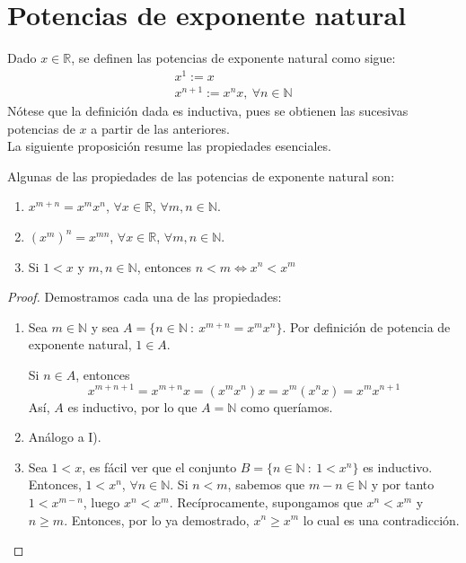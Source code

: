 
\section{Potencias de exponente natural}
Dado $x \in \mathbb{R}$, se definen las potencias de exponente natural como sigue:
\begin{gather*}
    x^1:=x\\
    x^{n+1}:=x^{n} x,~\forall n \in \mathbb{N}
\end{gather*}
Nótese que la definición dada es inductiva, pues se obtienen las sucesivas potencias de $x$ a
partir de las anteriores.\\

La siguiente proposición resume las propiedades esenciales.
\begin{prop}
    Algunas de las propiedades de las potencias de exponente natural son:
    \begin{enumerate}
        \item $x^{m+n}=x^m x^n$, $\forall x \in \mathbb{R}$, $\forall m,n \in \mathbb{N}$.

        \item $(x^m)^n=x^{mn}$, $\forall x \in \mathbb{R}$, $\forall m,n \in \mathbb{N}$.

        \item Si $1 < x$ y $m,n \in \mathbb{N}$, entonces $n < m \Leftrightarrow x^n < x^m$
    \end{enumerate}
\end{prop}
\begin{proof}
    Demostramos cada una de las propiedades:
    \begin{enumerate}
        \item Sea $m \in \mathbb{N}$ y sea $A=\{n \in \mathbb{N}~:~x^{m+n}=x^m x^n\}$.
        Por definición de potencia de exponente natural, $1 \in A$.
        
        Si $n \in A$, entonces
        \begin{equation*}
            x^{m+n+1}=x^{m+n} x=(x^m x^n) x=x^m (x^n x)=x^m x^{n+1}
        \end{equation*}
        Así, $A$ es inductivo, por lo que $A = \mathbb{N}$ como queríamos.

        \item Análogo a I).

        \item Sea $1 < x$, es fácil ver que el conjunto $B = \{n \in \mathbb{N}~:~1 < x^n\}$ es inductivo.
        Entonces, $1 < x^n$, $\forall n \in \mathbb{N}$. Si $n < m$, sabemos que $m-n \in \mathbb{N}$ y
        por tanto $1 < x^{m-n}$, luego $x^n < x^m$. Recíprocamente, supongamos que $x^n < x^m$ y $n \geq m$.
        Entonces, por lo ya demostrado, $x^n \geq x^m$ lo cual es una contradicción.
    \end{enumerate}
\end{proof}

